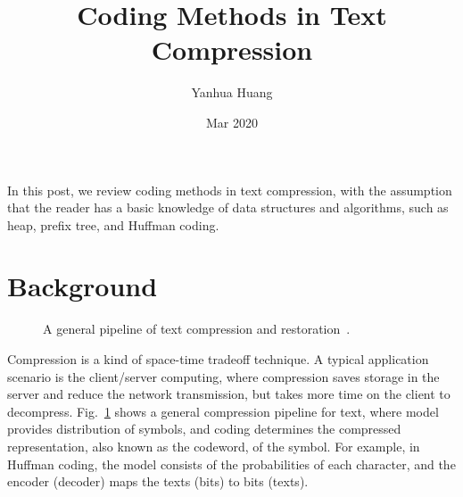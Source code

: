 \documentclass[a4paper,11pt]{article}
\begin{document}
\title{Coding Methods in Text Compression}
\author{Yanhua Huang}
\date{Mar 2020}
\maketitle

In this post, we review coding methods in text compression, with the assumption that the reader has a basic knowledge of data structures and algorithms, such as heap, prefix tree, and Huffman coding.

\section{Background}

\begin{figure}
\begin{center}
\end{center}
\caption {A general pipeline of text compression and restoration~\citep{witten1999managing}.}
\label{fig:general_pipeline}
\end{figure}

Compression is a kind of space-time tradeoff technique. A typical application scenario is the client/server computing, where compression saves storage in the server and reduce the network transmission, but takes more time on the client to decompress. Fig.~\ref{fig:general_pipeline} shows a general compression pipeline for text, where model provides distribution of symbols, and coding determines the compressed representation, also known as the codeword, of the symbol. For example, in Huffman coding, the model consists of the probabilities of each character, and the encoder (decoder) maps the texts (bits) to bits (texts). 
\end{document}
